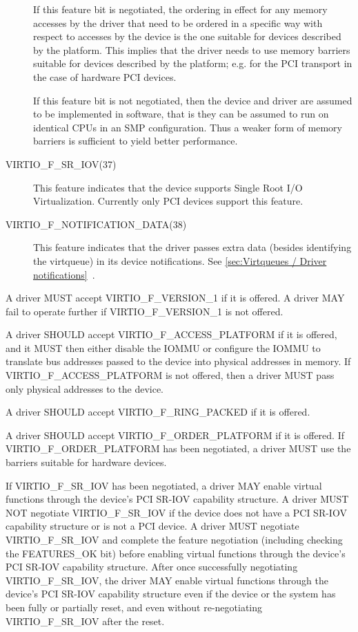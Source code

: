 \begin{description}
  If this feature bit is negotiated, the ordering in effect for any
  memory accesses by the driver that need to be ordered in a specific way
  with respect to accesses by the device is the one suitable for devices
  described by the platform. This implies that the driver needs to use
  memory barriers suitable for devices described by the platform; e.g.
  for the PCI transport in the case of hardware PCI devices.

  If this feature bit is not negotiated, then the device
  and driver are assumed to be implemented in software, that is
  they can be assumed to run on identical CPUs
  in an SMP configuration.
  Thus a weaker form of memory barriers is sufficient
  to yield better performance.
  \item[VIRTIO_F_SR_IOV(37)] This feature indicates that
  the device supports Single Root I/O Virtualization.
  Currently only PCI devices support this feature.
  \item[VIRTIO_F_NOTIFICATION_DATA(38)] This feature indicates
  that the driver passes extra data (besides identifying the virtqueue)
  in its device notifications.
  See \ref{sec:Virtqueues / Driver notifications}~.
\end{description}


A driver MUST accept VIRTIO_F_VERSION_1 if it is offered.  A driver
MAY fail to operate further if VIRTIO_F_VERSION_1 is not offered.

A driver SHOULD accept VIRTIO_F_ACCESS_PLATFORM if it is offered, and it MUST
then either disable the IOMMU or configure the IOMMU to translate bus addresses
passed to the device into physical addresses in memory.  If
VIRTIO_F_ACCESS_PLATFORM is not offered, then a driver MUST pass only physical
addresses to the device.

A driver SHOULD accept VIRTIO_F_RING_PACKED if it is offered.

A driver SHOULD accept VIRTIO_F_ORDER_PLATFORM if it is offered.
If VIRTIO_F_ORDER_PLATFORM has been negotiated, a driver MUST use
the barriers suitable for hardware devices.

If VIRTIO_F_SR_IOV has been negotiated, a driver MAY enable
virtual functions through the device's PCI SR-IOV capability
structure.  A driver MUST NOT negotiate VIRTIO_F_SR_IOV if
the device does not have a PCI SR-IOV capability structure
or is not a PCI device.  A driver MUST negotiate
VIRTIO_F_SR_IOV and complete the feature negotiation
(including checking the FEATURES_OK 
bit) before enabling virtual functions through the device's
PCI SR-IOV capability structure.  After once successfully
negotiating VIRTIO_F_SR_IOV, the driver MAY enable virtual
functions through the device's PCI SR-IOV capability
structure even if the device or the system has been fully
or partially reset, and even without re-negotiating
VIRTIO_F_SR_IOV after the reset.

